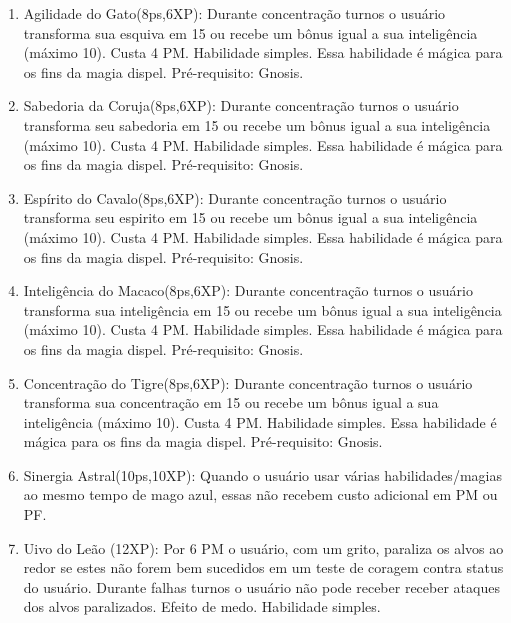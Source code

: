 \begin{enumerate}
	\item Agilidade do Gato(8ps,6XP): Durante concentração turnos o usuário transforma sua esquiva em 15 ou recebe um bônus igual a sua inteligência (máximo 10). Custa 4 PM. Habilidade simples. Essa habilidade é mágica para os fins da magia dispel. Pré-requisito: Gnosis.

	\item Sabedoria da Coruja(8ps,6XP): Durante concentração turnos o usuário transforma seu sabedoria em 15 ou recebe um bônus igual a sua inteligência (máximo 10). Custa 4 PM. Habilidade simples. Essa habilidade é mágica para os fins da magia dispel. Pré-requisito: Gnosis.

	\item Espírito do Cavalo(8ps,6XP): Durante concentração turnos o usuário transforma seu espirito em 15 ou recebe um bônus igual a sua inteligência (máximo 10). Custa 4 PM. Habilidade simples. Essa habilidade é mágica para os fins da magia dispel. Pré-requisito: Gnosis.

	\item Inteligência do Macaco(8ps,6XP): Durante concentração turnos o usuário transforma sua inteligência em 15 ou recebe um bônus igual a sua inteligência (máximo 10). Custa 4 PM. Habilidade simples. Essa habilidade é mágica para os fins da magia dispel. Pré-requisito: Gnosis.

	\item Concentração do Tigre(8ps,6XP): Durante concentração turnos o usuário transforma sua concentração em 15 ou recebe um bônus igual a sua inteligência (máximo 10). Custa 4 PM. Habilidade simples. Essa habilidade é mágica para os fins da magia dispel. Pré-requisito: Gnosis.

	\item Sinergia Astral(10ps,10XP): Quando o usuário usar várias habilidades/magias ao mesmo tempo de mago azul, essas não recebem custo adicional em PM ou PF. 

	\item Uivo do Leão (12XP): Por 6 PM o usuário, com um grito, paraliza os alvos ao redor se estes não forem bem sucedidos em um teste de coragem contra status do usuário. Durante falhas turnos o usuário não pode receber receber ataques dos alvos paralizados. Efeito de medo. Habilidade simples.


\end{enumerate}
